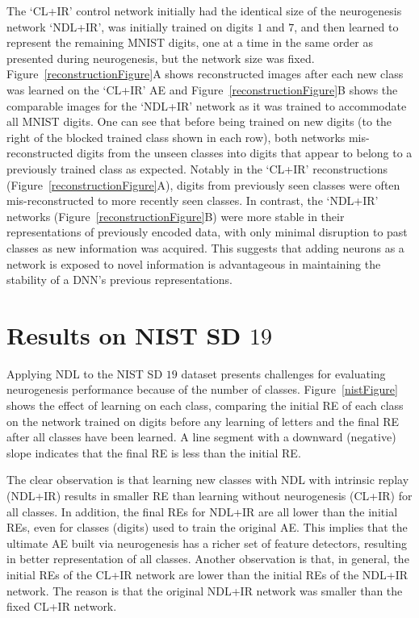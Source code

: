 \documentclass[10pt,conference]{IEEEtran}
\begin{document}
The `CL+IR' control network initially had the identical size of the neurogenesis network `NDL+IR', was initially trained on digits $1$ and $7$, and then learned to represent the remaining MNIST digits, one at a time in the same order as presented during neurogenesis, but the network size was fixed. Figure~\ref{reconstructionFigure}A shows reconstructed images after each new class was learned on the `CL+IR' AE and Figure~\ref{reconstructionFigure}B shows the comparable images for the `NDL+IR' network as it was trained to accommodate all MNIST digits. One can see that before being trained on new digits (to the right of the blocked trained class shown in each row), both networks mis-reconstructed digits from the unseen classes into digits that appear to belong to a previously trained class as expected. Notably in the `CL+IR' reconstructions (Figure~\ref{reconstructionFigure}A), digits from previously seen classes were often mis-reconstructed to more recently seen classes. In contrast, the `NDL+IR' networks (Figure~\ref{reconstructionFigure}B) were more stable in their representations of previously encoded data, with only minimal disruption to past classes as new information was acquired. This suggests that adding neurons as a network is exposed to novel information is advantageous in maintaining the stability of a DNN's previous representations.


\section{Results on NIST SD $19$}
Applying NDL to the NIST SD $19$ dataset presents challenges for evaluating neurogenesis performance because of the number of classes. Figure~\ref{nistFigure} shows the effect of learning on each class, comparing the initial RE of each class on the network trained on digits before any learning of letters and the final RE after all classes have been learned. A line segment with a downward (negative) slope indicates that the final RE is less than the initial RE. 

The clear observation is that learning new classes with NDL with intrinsic replay (NDL+IR) results in smaller RE than learning without neurogenesis (CL+IR) for all classes. In addition, the final REs for NDL+IR are all lower than the initial REs, even for classes (digits) used to train the original AE. This implies that the ultimate AE built via neurogenesis has a richer set of feature detectors, resulting in better representation of all classes. Another observation is that, in general, the initial REs of the CL+IR network are lower than the initial REs of the NDL+IR network. The reason is that the original NDL+IR network was smaller than the fixed CL+IR network.
\end{document}
